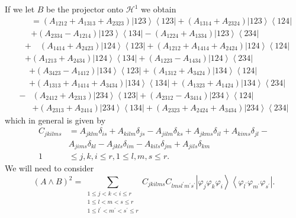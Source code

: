 \documentclass[aps,preprint]{revtex4}%
\begin{document}
If we let $B$ be the projector onto $\mathcal{H}^{1}$ we obtain
\begin{align}
\quad &  =\left(  A_{1212}+A_{1313}+A_{2323}\right)  \left\vert
123\right\rangle \left\langle 123\right\vert +\left(  A_{1314}+A_{2324}%
\right)  \left\vert 123\right\rangle \left\langle 124\right\vert \nonumber\\
&  +\left(  A_{2334}-A_{1214}\right)  \left\vert 123\right\rangle \left\langle
134\right\vert -\left(  A_{1224}+A_{1334}\right)  \left\vert 123\right\rangle
\left\langle 234\right\vert
\end{align}%
\begin{align}
&  +\quad\left(  A_{1414}+A_{2423}\right)  \left\vert 124\right\rangle
\left\langle 123\right\vert +\left(  A_{1212}+A_{1414}+A_{2424}\right)
\left\vert 124\right\rangle \left\langle 124\right\vert \nonumber\\
&  +\left(  A_{1213}+A_{2434}\right)  \left\vert 124\right\rangle \left\langle
134\right\vert +\left(  A_{1223}-A_{1434}\right)  \left\vert 124\right\rangle
\left\langle 234\right\vert
\end{align}%
\begin{align}
&  +\left(  A_{3423}-A_{1412}\right)  \left\vert 134\right\rangle \left\langle
123\right\vert +\left(  A_{1312}+A_{3424}\right)  \left\vert 134\right\rangle
\left\langle 124\right\vert \nonumber\\
&  +\left(  A_{1313}+A_{1414}+A_{3434}\right)  \left\vert 134\right\rangle
\left\langle 134\right\vert +\left(  A_{1323}+A_{1424}\right)  \left\vert
134\right\rangle \left\langle 234\right\vert
\end{align}%
\begin{align}
-  &  \left(  A_{2412}+A_{2313}\right)  \left\vert 234\right\rangle
\left\langle 123\right\vert +\left(  A_{2312}-A_{3414}\right)  \left\vert
234\right\rangle \left\langle 124\right\vert \nonumber\\
&  +\left(  A_{2313}+A_{2414}\right)  \left\vert 234\right\rangle \left\langle
134\right\vert +\left(  A_{2323}+A_{2424}+A_{3434}\right)  \left\vert
234\right\rangle \left\langle 234\right\vert
\end{align}
which in general is given by
\begin{align}
C_{jkilms}  &  =A_{jklm}\delta_{is}+A_{kilm}\delta_{js}-A_{jilm}\delta
_{ks}+A_{jkms}\delta_{il}+A_{kims}\delta_{jl}-\nonumber\\
&  A_{jims}\delta_{kl}-A_{jkls}\delta_{im}-A_{kils}\delta_{jm}+A_{jils}%
\delta_{km}\nonumber\\
1  &  \leq j,k,i\leq r,1\leq l,m,s\leq r.
\end{align}
We will need to consider
\begin{equation}
\left(  A\wedge B\right)  ^{2}=\sum_{\substack{1\leq j<k<i\leq r\\1\leq
l<m<s\leq r\\1\leq l^{\prime}<m^{\prime}<s^{\prime}\leq r}}C_{jkilms}%
C_{lmsl^{\prime}m^{\prime}s^{\prime}}\left\vert \varphi_{j}\varphi_{k}%
\varphi_{i}\right\rangle \left\langle \varphi_{l^{\prime}}\varphi_{m^{\prime}%
}\varphi_{s^{\prime}}\right\vert .
\end{equation}
\end{document}
